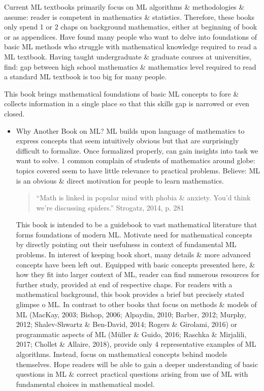 \documentclass{article}
\begin{document}
Current ML textbooks primarily focus on ML algorithms \& methodologies \& assume: reader is competent in mathematics \& statistics. Therefore, these books only spend 1 or 2 chaps on background mathematics, either at beginning of book or as appendices. Have found many people who want to delve into foundations of basic ML methods who struggle with mathematical knowledge required to read a ML textbook. Having taught undergraduate \& graduate courses at universities, find: gap between high school mathematics \& mathematics level required to read a standard ML textbook is too big for many people.

This book brings mathematical foundations of basic ML concepts to fore \& collects information in a single place so that this skills gap is narrowed or even closed.
\begin{itemize}
	\item {\sf Why Another Book on ML?} ML builds upon language of mathematics to express concepts that seem intuitively obvious but that are surprisingly difficult to formalize. Once formalized properly, can gain insights into task we want to solve. 1 common complain of students of mathematics around globe: topics covered seem to have little relevance to practical problems. Believe: ML is an obvious \& direct motivation for people to learn mathematics.
	\begin{quote}
		``Math is linked in popular mind with phobia \& anxiety. You'd think we're discussing spiders.'' Strogatz, 2014, p. 281
	\end{quote}
	This book is intended to be a guidebook to vast mathematical literature that forms foundations of modern ML. Motivate need for mathematical concepts by directly pointing out their usefulness in context of fundamental ML problems. In interest of keeping book short, many details \& more advanced concepts have been left out. Equipped with basic concepts presented here, \& how they fit into larger context of ML, reader can find numerous resources for further study, provided at end of respective chaps. For readers with a mathematical background, this book provides a brief but precisely stated glimpse o ML. In contrast to other books that focus on methods \& models of ML (MacKay, 2003; Bishop, 2006; Alpaydin, 2010; Barber, 2012; Murphy, 2012; Shalev-Shwartz \& Ben-David, 2014; Rogers \& Girolami, 2016) or programmatic aspects of ML (Müller \& Guido, 2016; Raschka \& Mirjalili, 2017; Chollet \& Allaire, 2018), provide only 4 representative examples of ML algorithms. Instead, focus on mathematical concepts behind models themselves. Hope readers will be able to gain a deeper understanding of basic questions in ML \& correct practical questions arising from use of ML with fundamental choices in mathematical model.
	

\end{itemize}
\end{document}
